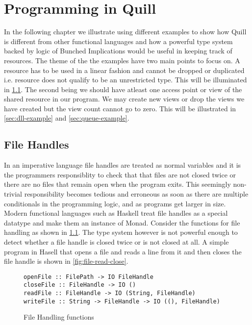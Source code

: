 \chapter{Programming in Quill}
In the following chapter we illustrate using different examples to show how Quill is different
from other functional languages and how a powerful type system backed by logic of Bunched Implications
would be useful in keeping track of resources. The theme of the the examples have two main
points to focus on. A resource has to be used in a linear fashion and cannot be dropped or duplicated i.e. resource
does not qualify to be an unrestricted type. This will be illuminated in \cref{sec:file-handle-example}.
The second being we should have atleast one access point or view of the shared resource in our program.
We may create new views or drop the views we have created but the view count cannot go to zero. This will
be illustrated in \cref{sec:dll-example} and \cref{sec:queue-example}.

\section{File Handles}\label{sec:file-handle-example}
In an imperative language file handles are treated as normal variables
and it is the programmers responsiblity to check that that files are not closed twice
or there are no files that remain open when the program exits. This seemingly non-trivial
responsibility becomes tedious and erroneous as soon as there are multiple conditionals in the programming
logic, and as programs get larger in size. Modern functional languages such as Haskell treat file handles as
a special datatype and make them an instance of Monad. Consider the functions for file handling
as shown in \cref{fig:file-handling-function}. The type system however is not powerful enough
to detect whether a file handle is closed twice or is not closed at all. A simple program in Hasell that opens a file and reads
a line from it and then closes the file handle is shown in \cref{fig:file-read-close}.

\begin{figure}[h]
  \begin{framed}
    \begin{verbatim}
openFile :: FilePath -> IO FileHandle
closeFile :: FileHandle -> IO ()
readFile :: FileHandle -> IO (String, FileHandle)
writeFile :: String -> FileHandle -> IO ((), FileHandle)
    \end{verbatim}
  \end{framed}
  \caption{File Handling functions}
  \label{fig:file-handling-function}
\end{figure}

